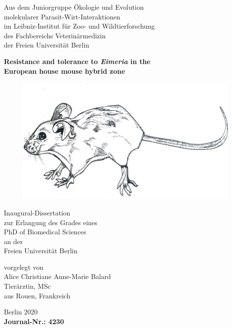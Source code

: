 \begin{titlepage}
    \begin{center}
        Aus dem Juniorgruppe Ökologie und Evolution \\
        molekularer Parasit-Wirt-Interaktionen \\
        im Leibniz-Institut für Zoo- und Wildtierforschung \\
        des Fachbereichs Veterinärmedizin \\
        der Freien Universität Berlin
        
        \vfill
        \textbf{{\Large Resistance and tolerance to \textit{Eimeria} in the \\European house mouse hybrid zone}}
 \begin{figure}[H]
    \centering
    \includegraphics[width=.7\linewidth,height=\textheight,keepaspectratio]{images/mouse.png}
\end{figure}

       \vfill
 
        Inaugural-Dissertation \\
        zur Erlangung des Grades eines \\
        PhD of Biomedical Sciences \\
        an der \\
        Freien Universität Berlin
 
        \vfill

        vorgelegt von \\
        Alice Christiane Anne-Marie Balard \\
        Tierärztin, MSc \\
        aus Rouen, Frankreich
        
        \vfill
        
        Berlin 2020 \\
        \textbf{Journal-Nr.: 4230}

    \end{center}
\end{titlepage}
